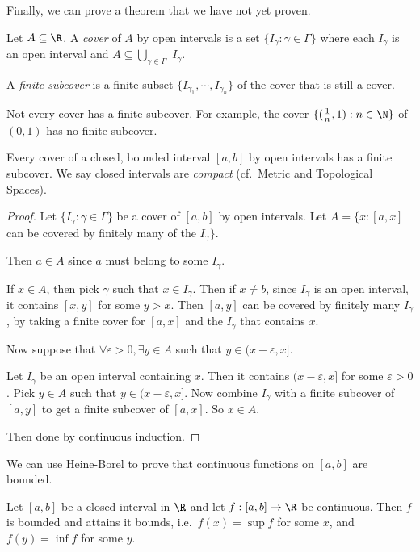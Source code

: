 \documentclass[a4paper]{article}
\begin{document}
Finally, we can prove a theorem that we have not yet proven.
\begin{defi}
  Let $A\subseteq \R$. A \emph{cover} of $A$ by open intervals is a set $\{I_\gamma: \gamma\in \Gamma\}$ where each $I_\gamma$ is an open interval and $A \subseteq \bigcup_{\gamma\in \Gamma}$ $I_\gamma$.

  A \emph{finite subcover} is a finite subset $\{I_{\gamma_1}, \cdots, I_{\gamma_n}\}$ of the cover that is still a cover.
\end{defi}

Not every cover has a finite subcover. For example, the cover $\{(\frac{1}{n}, 1): n\in \N\}$ of $(0, 1)$ has no finite subcover.

\begin{thm}
  Every cover of a closed, bounded interval $[a, b]$ by open intervals has a finite subcover. We say closed intervals are \emph{compact} (cf.\ Metric and Topological Spaces).
\end{thm}

\begin{proof}
  Let $\{I_\gamma: \gamma\in \Gamma\}$ be a cover of $[a, b]$ by open intervals. Let $A = \{x: [a, x]$ can be covered by finitely many of the $I_\gamma\}$.

  Then $a\in A$ since $a$ must belong to some $I_\gamma$.

  If $x\in A$, then pick $\gamma$ such that $x\in I_\gamma$. Then if $x\not = b$, since $I_\gamma$ is an open interval, it contains $[x, y]$ for some $y > x$. Then $[a, y]$ can be covered by finitely many $I_\gamma$, by taking a finite cover for $[a, x]$ and the $I_\gamma$ that contains $x$.

  Now suppose that $\forall \varepsilon > 0, \exists y\in A$ such that $y\in (x - \varepsilon, x]$.

  Let $I_\gamma$ be an open interval containing $x$. Then it contains $(x - \varepsilon, x]$ for some $\varepsilon > 0$. Pick $y\in A$ such that $y\in (x - \varepsilon, x]$. Now combine $I_\gamma$ with a finite subcover of $[a, y]$ to get a finite subcover of $[a, x]$. So $x\in A$.

  Then done by continuous induction.
\end{proof}

We can use Heine-Borel to prove that continuous functions on $[a, b]$ are bounded.

\begin{thm}
  Let $[a, b]$ be a closed interval in $\R$ and let $f: [a, b] \to \R$ be continuous. Then $f$ is bounded and attains it bounds, i.e.\ $f(x) = \sup f$ for some $x$, and $f(y) = \inf f$ for some $y$.
\end{thm}
\end{document}
